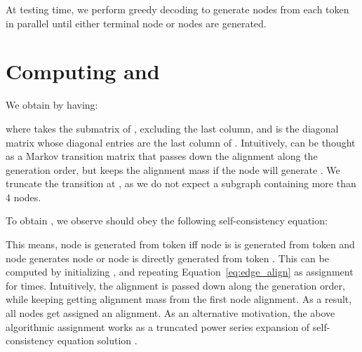\documentclass[11pt]{article}
\begin{document}
At testing time, we perform greedy decoding to generate nodes from each token in parallel until either terminal node or  nodes are generated.
\section{Computing  and } \label{appendix:align_derivative} 
We obtain  by having:

where  takes the submatrix of  , excluding the last column, and  is the diagonal matrix whose diagonal entries are the last column of . Intuitively,  can be thought as a Markov transition matrix that passes down the alignment along the generation order, but keeps the alignment mass if the node will generate . We truncate the transition at , as we do not expect a subgraph containing more than 4 nodes.


To obtain , we observe  should obey the following self-consistency equation:

This means, node  is generated from token  iff node  is is generated from token  and node  generates node  or node   is directly generated from token . This  can be computed  by initializing , and repeating Equation~\ref{eq:edge_align} as assignment for  times. Intuitively, the  alignment is passed down along the generation order, while keeping getting alignment mass from the first node alignment. As a result, all nodes get assigned an alignment. As an alternative motivation, the above algorithmic assignment works as a truncated power series expansion of self-consistency equation solution .
\end{document}
